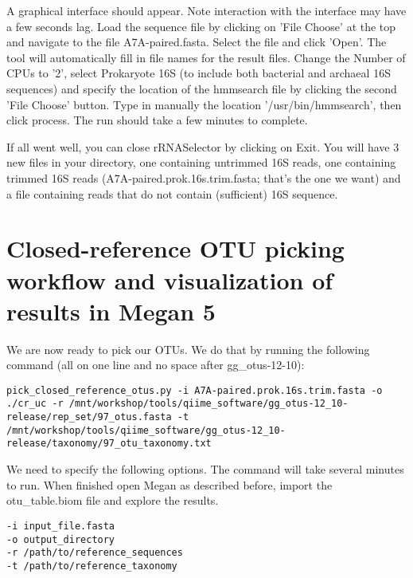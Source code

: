 A graphical interface should appear. Note interaction with the interface may have a few seconds lag. Load the sequence file by clicking on 'File Choose' at the top and navigate to the file A7A-paired.fasta. Select the file and click 'Open'. The tool will automatically fill in file names for the result files. Change the Number of CPUs to '2', select Prokaryote 16S (to include both bacterial and archaeal 16S sequences) and specify the location of the hmmsearch file by clicking the second 'File Choose' button. Type in manually the location '/usr/bin/hmmsearch', then click process. The run should take a few minutes to complete.

If all went well, you can close rRNASelector by clicking on Exit. You will have 3 new files in your directory, one containing untrimmed 16S reads, one containing trimmed 16S reads (A7A-paired.prok.16s.trim.fasta; that's the one we want) and a file containing reads that do not contain (sufficient) 16S sequence.

\section{Closed-reference OTU picking workflow and visualization of results in Megan 5}
\begin{steps}
We are now ready to pick our OTUs. We do that by running the following command (all on one line and no space after gg\_otus-12-10):

\begin{lstlisting}
pick_closed_reference_otus.py -i A7A-paired.prok.16s.trim.fasta -o ./cr_uc -r /mnt/workshop/tools/qiime_software/gg_otus-12_10-release/rep_set/97_otus.fasta -t /mnt/workshop/tools/qiime_software/gg_otus-12_10-release/taxonomy/97_otu_taxonomy.txt
\end{lstlisting}
\end{steps}

\begin{steps}
We need to specify the following options. 
The command will take several minutes to run. When finished open Megan as described before, import the otu\_table.biom file and explore the results.

\begin{lstlisting}
-i input_file.fasta
-o output_directory
-r /path/to/reference_sequences
-t /path/to/reference_taxonomy

\end{lstlisting}
\end{steps}

